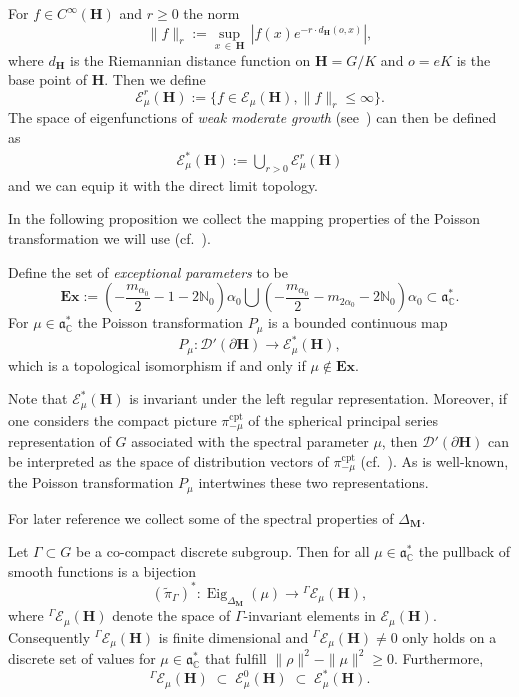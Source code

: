 \documentclass[AHL, Unicode, longabstracts, published]{cedram}
\DeclareMathOperator{\Eig}{Eig}
\DeclareMathOperator{\cpt}{cpt}
\newcommand{\mc}{\mathcal}
\newcommand{\cc}{\mathbb{C}}
\newcommand{\bfh}{\mathbf{H}}
\newcommand{\bfm}{\mathbf{M}}
\newcommand{\pl}{\partial}
\newcommand{\til}{\widetilde}
\newcommand{\N}{\mathbb{N}}
\renewcommand{\a}{\mathfrak a}
\begin{document}
For $f\in C^\infty({\bfh})$ and $r\geq 0$ the norm
\[
\|f\|_r:= \sup_{x\,\in\,{\bfh}}\,\left|f(x) e^{-r\cdot d_{{\bfh}}(o,x)}\right|,
\]
where $d_{{\bfh}}$ is the Riemannian distance function on ${\bfh}=G/K$ and $o=eK$ is the base point of ${\bfh}$. Then we define
\[
\mathcal E^r_\mu({\bfh}) :=\{f\in \mathcal E_\mu({\bfh}), \|f\|_r\leq\infty\}.
\]
The space of eigenfunctions of \emph{weak moderate growth} (see~\cite[Remark~12.5]{vBS87}) can then be defined as
\begin{align*}
\mathcal E^*_\mu({\bfh}) := \bigcup_{r>0}\mathcal E^r_\mu({\bfh})
\end{align*}
and we can equip it with the direct limit topology.

In the following proposition we collect the mapping properties of the Poisson transformation we will use (cf.~\cite{vBS87}).


\begin{prop}\label{thm:poisson_trafo}
Define the set of \emph{exceptional parameters} to be
\begin{equation}\label{eq:exceptional_points}
\mathbf{Ex} := \left(-\frac{m_{\alpha_0}}{2} - 1-2\N_0\right)\alpha_0
\bigcup\left(-\frac{m_{\alpha_0}}{2} - m_{2\alpha_0}-2\N_0\right)\alpha_0\subset \a^*_\cc.
\end{equation}
For $\mu\in \a^*_\cc$ the Poisson transformation $P_\mu$ is a bounded continuous map
\begin{equation}\label{eq:P_mu_isom_dist}
P_\mu:\mathcal D'(\pl{\bfh})\to \mathcal E^*_\mu({\bfh}),
\end{equation}
which is a topological isomorphism if and only if $\mu \notin \mathbf{Ex}$.
\end{prop}

Note that $\mathcal E^*_\mu({\bfh})$ is invariant under the left regular representation. Moreover, if one considers the compact picture $\pi_{-\mu}^{\cpt}$ of the spherical principal series representation of $G$ associated with the spectral parameter $\mu$, then $\mathcal D'(\pl{\bfh})$ can be interpreted as the space of distribution vectors of $\pi_{-\mu}^{\cpt}$ (cf.~\cite{vBS87}). As is well-known, the Poisson transformation $P_\mu$ intertwines these two representations.

For later reference we collect some of the spectral properties of $\Delta_{\bfm}$.

\begin{rema}\label{lem:lift_quantum}
Let $\Gamma\subset G$ be a co-compact discrete subgroup. Then for all $\mu\in \a^*_\cc$ the pullback of smooth functions is a bijection
\[
(\til\pi_{\Gamma})^*: \Eig_{\Delta_{\bfm}}(\mu)\to{^\Gamma \mathcal E_\mu({\bfh})},
\]
where ${^\Gamma \mathcal E_\mu({\bfh})}$ denote the space of $\Gamma$-invariant elements in $\mc{E}_\mu({\bfh})$. Consequently $^\Gamma \mathcal E_\mu({\bfh})$ is finite dimensional and $^\Gamma \mathcal E_\mu({\bfh})\neq 0$ only holds on a discrete set of values for $\mu\in \a^*_\cc$ that fulfill $\|\rho\|^2-\|\mu\|^2\geq 0$. Furthermore,
\[
^\Gamma \mathcal E_\mu({\bfh})\;\subset\;\mathcal E_\mu^0({\bfh})\;\subset\;\mathcal E^*_\mu({\bfh}).
\]
\end{rema}
\end{document}
